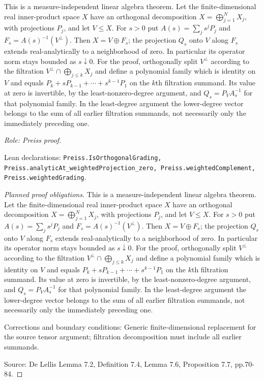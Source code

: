 \begin{lemma}
\label{lem:graded-analytic-projection}


This is a measure-independent linear algebra theorem. Let the finite-dimensional
real inner-product space $X$ have an orthogonal decomposition
$X=\bigoplus_{j=1}^{N}X_j$, with projections $P_j$, and let $V\leq X$.
For $s>0$ put $A(s)=\sum_j s^jP_j$ and
$F_s=A(s)^{-1}(V^\perp)$. Then $X=V\oplus F_s$; the projection $Q_s$
onto $V$ along $F_s$ extends real-analytically to a neighborhood of zero.
In particular its operator norm stays bounded as $s\downarrow0$.
For the proof, orthogonally split $V^\perp$ according to the filtration
$V^\perp\cap\bigoplus_{j\leq k}X_j$ and define a polynomial family which
is identity on $V$ and equals $P_k+sP_{k-1}+\cdots+s^{k-1}P_1$ on the
$k$th filtration summand. Its value at zero is invertible, by the
least-nonzero-degree argument, and $Q_s=P_V A_s^{-1}$ for that polynomial
family. In the least-degree argument the lower-degree vector belongs to the
sum of all earlier filtration summands, not necessarily only the immediately
preceding one.
\par\emph{Role: Preiss proof.}
\par Lean declarations: \texttt{Preiss.IsOrthogonalGrading, Preiss.analyticAt\_weightedProjection\_zero, Preiss.weightedComplement, Preiss.weightedGrading}.
\end{lemma}
\begin{proof}[Planned proof obligations]
This is a measure-independent linear algebra theorem. Let the finite-dimensional
real inner-product space $X$ have an orthogonal decomposition
$X=\bigoplus_{j=1}^{N}X_j$, with projections $P_j$, and let $V\leq X$.
For $s>0$ put $A(s)=\sum_j s^jP_j$ and
$F_s=A(s)^{-1}(V^\perp)$. Then $X=V\oplus F_s$; the projection $Q_s$
onto $V$ along $F_s$ extends real-analytically to a neighborhood of zero.
In particular its operator norm stays bounded as $s\downarrow0$.
For the proof, orthogonally split $V^\perp$ according to the filtration
$V^\perp\cap\bigoplus_{j\leq k}X_j$ and define a polynomial family which
is identity on $V$ and equals $P_k+sP_{k-1}+\cdots+s^{k-1}P_1$ on the
$k$th filtration summand. Its value at zero is invertible, by the
least-nonzero-degree argument, and $Q_s=P_V A_s^{-1}$ for that polynomial
family. In the least-degree argument the lower-degree vector belongs to the
sum of all earlier filtration summands, not necessarily only the immediately
preceding one.
\par Corrections and boundary conditions: Generic finite-dimensional replacement for the source tensor argument; filtration decomposition must include all earlier summands.
\par Source: De Lellis Lemma 7.2, Definition 7.4, Lemma 7.6, Proposition 7.7, pp.70-84.
\end{proof}


